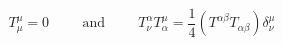 \begin{equation}
T^{\mu}_{\mu} =0 \hspace{1cm} \mbox{and} \hspace{1cm} T^{\alpha}_{\nu}T^{\mu}_{\alpha} = \frac{1}{4} (T^{\alpha \beta} T_{\alpha \beta}) \delta^{\mu}_{\nu}
\end{equation}

